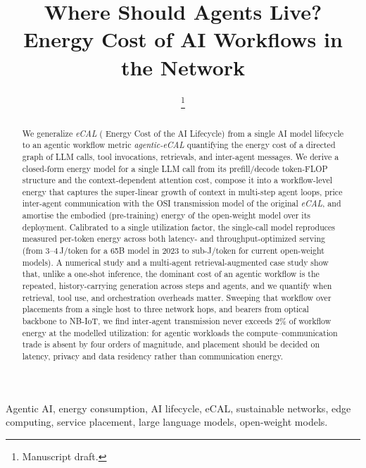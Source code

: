 \documentclass[journal]{IEEEtran}
\newif\ifshowchanges \showchangestrue
\newcommand{\NEW}{\ifshowchanges\color{blue}\fi}
\newcommand{\OLD}{\ifshowchanges\color{black}\fi}
\newcommand{\agecal}{\textit{agentic-eCAL}}
\newcommand{\ecal}{\textit{eCAL}}
\begin{document}
\title{Where Should Agents Live? \\Energy Cost of AI Workflows in the Network}

\author{%
\thanks{Manuscript draft. }}

\maketitle

\begin{abstract}


We generalize \ecal{} ( Energy Cost of the AI
Lifecycle) from a single AI model lifecycle to an agentic workflow metric \agecal{} quantifying the energy cost of a 
directed graph of LLM calls, tool invocations, retrievals, and inter-agent messages. We derive a
closed-form energy model for a single LLM call from its prefill/decode token-FLOP structure and the
context-dependent attention cost, compose it into a workflow-level energy that captures the
super-linear growth of context in multi-step agent loops, price inter-agent communication with the
OSI transmission model of the original \ecal{}, and amortise the embodied (pre-training) energy of
the open-weight model over its deployment. Calibrated to a single utilization
factor, the single-call model reproduces measured per-token energy across both latency- and
throughput-optimized serving (from $3$--$4$\,J/token for a 65B model in 2023 to sub-J/token for
current open-weight models). A numerical study and a multi-agent retrieval-augmented case study show
that, unlike a one-shot inference, the dominant cost of an agentic workflow is the repeated,
history-carrying generation across steps and agents, and we quantify when retrieval, tool use, and
orchestration overheads matter. \NEW Sweeping that workflow over placements from a single host to
three network hops, and bearers from optical backbone to NB-IoT, we find inter-agent transmission
never exceeds $2\%$ of workflow energy at the modelled utilization: for agentic workloads the
compute--communication trade is
absent by four orders of magnitude, and placement should be decided on latency, privacy and data
residency rather than communication energy.\OLD
\end{abstract}

\begin{IEEEkeywords}
Agentic AI, energy consumption, AI lifecycle, eCAL,
sustainable networks, edge computing, service placement, large language models, open-weight models.
\end{IEEEkeywords}
\end{document}
